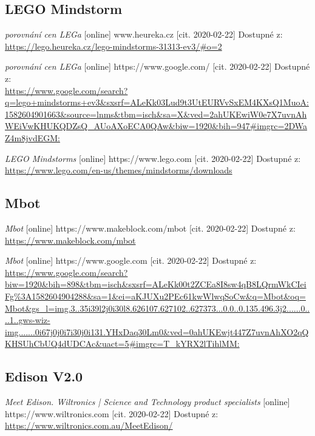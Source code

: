 \documentclass{template/socthesis}
\begin{document}
\newpage
\renewcommand{\refname}{Literatura}
\printbibliography


\listoffigures
{}

\listoftables
{}
\renewcommand{\refname}{Další zdroje}



\begin{thebibliography}{12}
	
	\subsection*{LEGO Mindstorm}	
	\textit{porovnání cen LEGa} [online] www.heureka.cz [cit. 2020-02-22] Dostupné z: 
	\url{https://lego.heureka.cz/lego-mindstorms-31313-ev3/#o=2}
	
	\textit{porovnání cen LEGa} [online] https://www.google.com/ [cit. 2020-02-22] Dostupné z: \\ 
	\url{https://www.google.com/search?q=lego+mindstorms+ev3&sxsrf=ALeKk03Lud9t3UtEURVvSxEM4KXsQ1MuoA:1582604901663&source=lnms&tbm=isch&sa=X&ved=2ahUKEwiW0e7X7uvnAhWEiVwKHUKQDZsQ_AUoAXoECA0QAw&biw=1920&bih=947#imgrc=2DWaZ4m8jvdEGM:}
	
	\textit{LEGO Mindstorms} [online] https://www.lego.com [cit. 2020-02-22] Dostupné z: \url{https://www.lego.com/en-us/themes/mindstorms/downloads}
	
	\subsection*{Mbot}	
	
	\textit{Mbot} [online] https://www.makeblock.com/mbot [cit. 2020-02-22] Dostupné z: \url{https://www.makeblock.com/mbot}
	
	\textit{Mbot} [online] https://www.google.com [cit. 2020-02-22] Dostupné z: \url{https://www.google.com/search?biw=1920&bih=898&tbm=isch&sxsrf=ALeKk00t2ZCEa8I8sw4qB8LQrmWkCIeiFg%3A1582604904288&sa=1&ei=aKJUXu2PEc61kwWlwqSoCw&q=Mbot&oq=Mbot&gs_l=img.3..35i39l2j0i30l8.626107.627102..627373...0.0..0.135.496.3j2......0....1..gws-wiz-img.......0i67j0j0i7i30j0i131.YHxDaq30Lm0&ved=0ahUKEwjt447Z7uvnAhXO2qQKHSUhCbUQ4dUDCAc&uact=5#imgrc=T_kYRX2lTihlMM:}
	
	
	\subsection*{Edison V2.0}
	\textit{Meet Edison. Wiltronics | Science and Technology product specialists} [online] https://www.wiltronics.com [cit. 2020-02-22] Dostupné z: \url{https://www.wiltronics.com.au/MeetEdison/}
	

\end{thebibliography}
\end{document}
